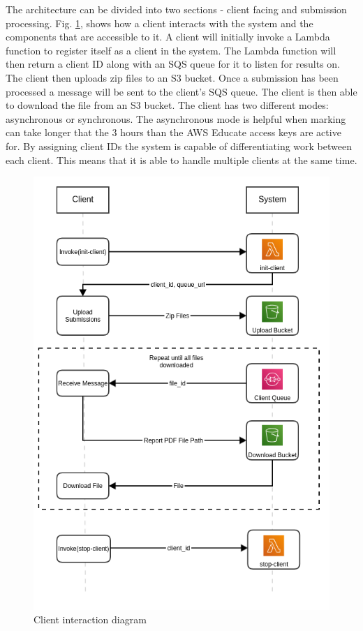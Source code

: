 \documentclass[runningheads]{llncs}
\begin{document}
The architecture can be divided into two sections - client facing and submission processing. Fig. \ref{fig:client-interaction}, shows how a client interacts with the system and the components that are accessible to it. A client will initially invoke a Lambda function to register itself as a client in the system. The Lambda function will then return a client ID along with an SQS queue for it to listen for results on. The client then uploads zip files to an S3 bucket. Once a submission has been processed a message will be sent to the client's SQS queue. The client is then able to download the file from an S3 bucket. The client has two different modes: asynchronous or synchronous. The asynchronous mode is helpful when marking can take longer that the 3 hours than the AWS Educate access keys are active for. By assigning client IDs the system is capable of differentiating work between each client. This means that it is able to handle multiple clients at the same time.

\begin{figure}[ht]
\vspace{-1em}
    \centering
    \includegraphics[scale=0.38]{architecture-diagrams/client_interaction.png}
    \vspace{-2em}
    \caption{Client interaction diagram}
    \label{fig:client-interaction}
    \vspace{-1em}
\end{figure}
\end{document}
